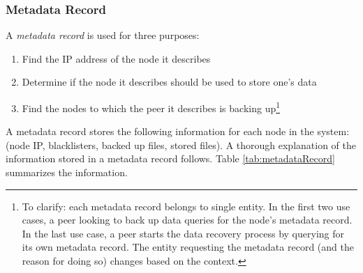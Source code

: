 \documentclass[12pt]{report}
\begin{document}
\subsubsection{Metadata Record} \label{subsubsec:MetadataRecord}

A \textit{metadata record} is used for three purposes:

\begin{enumerate}
  \item Find the IP address of the node it describes
  \item Determine if the node it describes should be used to store one's data
  \item Find the nodes to which the peer it describes is backing up\footnote{To clarify: each metadata record belongs to single entity. In the first two use cases, a peer looking to back up data queries for the node's metadata record. In the last use case, a peer starts the data recovery process by querying for its own metadata record. The entity requesting the metadata record (and the reason for doing so) changes based on the context.}
\end{enumerate}

A metadata record stores the following information for each node in the system: (node IP, blacklisters, backed up files, stored files). A thorough explanation of the information stored in a metadata record follows. Table \ref{tab:metadataRecord} summarizes the information.
\end{document}
